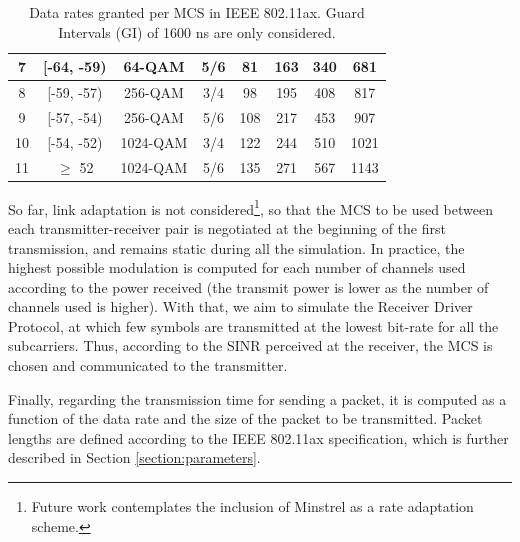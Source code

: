 \documentclass[a4paper]{article}
\begin{document}
\begin{table}[]
{\begin{tabular}{|c|c|c|c|c|c|c|c|}
			7 & {[}-64, -59) & 64-QAM & 5/6 & 81 & 163 & 340 & 681 \\ \hline
			8 & {[}-59, -57) & 256-QAM & 3/4 & 98 & 195 & 408 & 817 \\ \hline
			9 & {[}-57, -54) & 256-QAM & 5/6 & 108 & 217 & 453 & 907 \\ \hline
			10 & {[}-54, -52) & 1024-QAM & 3/4 & 122 & 244 & 510 & 1021 \\ \hline
			11 & $\geq$ 52 & 1024-QAM & 5/6 & 135 & 271 & 567 & 1143 \\ \hline
		\end{tabular}}
		\caption{Data rates granted per MCS in IEEE 802.11ax. Guard Intervals (GI) of 1600 ns are only considered.}
		\label{table:sinr_thresholds_mcs}	
	\end{table}
	
	So far, link adaptation is not considered\footnote{Future work contemplates the inclusion of Minstrel as a rate adaptation scheme.}, so that the MCS to be used between each transmitter-receiver pair is negotiated at the beginning of the first transmission, and remains static during all the simulation. In practice, the highest possible modulation is computed for each number of channels used according to the power received (the transmit power is lower as the number of channels used is higher).  With that, we aim to simulate the Receiver Driver Protocol, at which few symbols are transmitted at the lowest bit-rate for all the subcarriers. Thus, according to the SINR perceived at the receiver, the MCS is chosen and communicated to the transmitter.
		
	Finally, regarding the transmission time for sending a packet, it is computed as a function of the data rate and the size of the packet to be transmitted. Packet lengths are defined according to the IEEE 802.11ax specification, which is further described in Section \ref{section:parameters}.

\end{document}
